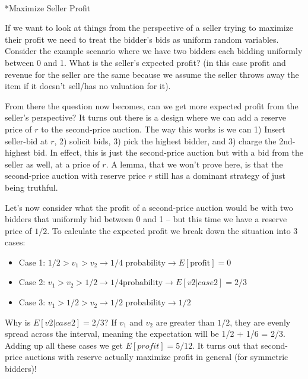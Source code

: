 \documentclass[
  letterpaper,
  numbers=noenddot,
  DIV=11,
  oneside]{scrreprt}
\makeatletter
\let\oldparagraph\paragraph
\renewcommand{\paragraph}{
    \@ifstar
      \xxxParagraphStar
      \xxxParagraphNoStar
  }
\newcommand{\xxxParagraphStar}[1]{\oldparagraph*{#1}\mbox{}}
\newcommand{\xxxParagraphNoStar}[1]{\oldparagraph{#1}\mbox{}}
\theoremstyle{remark}
\makeatother
\begin{document}
\paragraph*{Maximize Seller Profit}\label{maximize-seller-profit}

If we want to look at things from the perspective of a seller trying to
maximize their profit we need to treat the bidder's bids as uniform
random variables. Consider the example scenario where we have two
bidders each bidding uniformly between 0 and 1. What is the seller's
expected profit? (in this case profit and revenue for the seller are the
same because we assume the seller throws away the item if it doesn't
sell/has no valuation for it).

From there the question now becomes, can we get more expected profit
from the seller's perspective? It turns out there is a design where we
can add a reserve price of \(r\) to the second-price auction. The way
this works is we can 1) Insert seller-bid at \(r\), 2) solicit bids, 3)
pick the highest bidder, and 3) charge the 2nd-highest bid. In effect,
this is just the second-price auction but with a bid from the seller as
well, at a price of \(r\). A lemma, that we won't prove here, is that
the second-price auction with reserve price \(r\) still has a dominant
strategy of just being truthful.

Let's now consider what the profit of a second-price auction would be
with two bidders that uniformly bid between 0 and 1 -- but this time we
have a reserve price of \(1/2\). To calculate the expected profit we
break down the situation into 3 cases:

\begin{itemize}
\item
  Case 1:
  \(1/2 > v_1 > v_2 \rightarrow 1/4 \text{ probability} \rightarrow  E[\text{profit}] = 0\)
\item
  Case 2:
  \(v_1 > v_2 > 1/2 \rightarrow 1/4 \text{probability} \rightarrow E[v2 | case 2] = 2/3\)
\item
  Case 3:
  \(v_1 > 1/2 > v_2 \rightarrow 1/2 \text{ probability} \rightarrow 1/2\)
\end{itemize}

Why is \(E[v2 | case 2] = 2/3\)? If \(v_1\) and \(v_2\) are greater than
\(1/2\), they are evenly spread across the interval, meaning the
expectation will be 1/2 + 1/6 = 2/3. Adding up all these cases we get
\(E[profit] = 5/12\). It turns out that second-price auctions with
reserve actually maximize profit in general (for symmetric bidders)!
\end{document}
